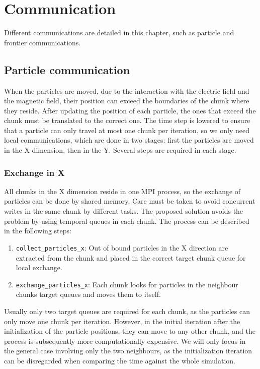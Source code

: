 \chapter{Communication}
\label{ch:comm}

Different communications are detailed in this chapter, such as particle and 
frontier communications.

\section{Particle communication}

When the particles are moved, due to the interaction with the electric field and 
the magnetic field, their position can exceed the boundaries of the chunk where 
they reside. After updating the position of each particle, the ones that exceed 
the chunk must be translated to the correct one. The time step is lowered to 
ensure that a particle can only travel at most one chunk per iteration, so we 
only need local communications, which are done in two stages: first the 
particles are moved in the X dimension, then in the Y. Several steps are 
required in each stage.

\subsection{Exchange in X}
\label{sec:exchange-x}

All chunks in the X dimension reside in one MPI process, so the exchange of 
particles can be done by shared memory. Care must be taken to avoid concurrent 
writes in the same chunk by different tasks. The proposed solution avoids the 
problem by using temporal queues in each chunk. The process can be described in 
the following steps:
%
\begin{enumerate}
\item \texttt{collect\_particles\_x}: Out of bound particles in the X direction 
are extracted from the chunk and placed in the correct target chunk queue for 
local exchange.
\item \texttt{exchange\_particles\_x}: Each chunk looks for particles in the 
neighbour chunks target queues and moves them to itself.
\end{enumerate}
%
Usually only two target queues are required for each chunk, as the particles can 
only move one chunk per iteration. However, in the initial iteration after the 
initialization of the particle positions, they can move to any other chunk, and 
the process is subsequently more computationally expensive. We will only focus 
in the general case involving only the two neighbours, as the initialization 
iteration can be disregarded when comparing the time against the whole 
simulation.

